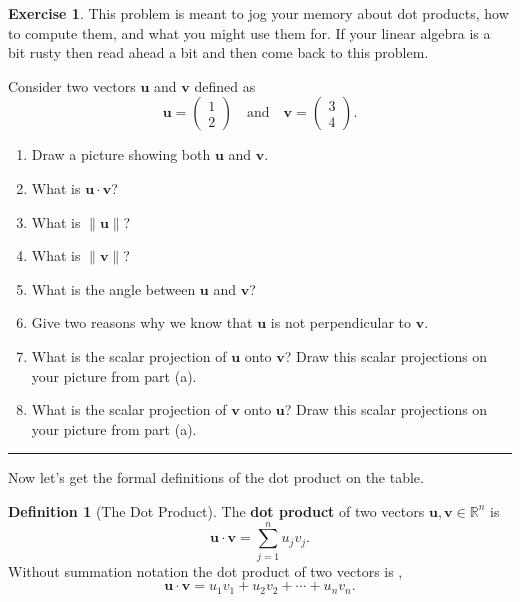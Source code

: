 \documentclass[
]{book}
\providecommand{\tightlist}{%
  \setlength{\itemsep}{0pt}\setlength{\parskip}{0pt}}
\theoremstyle{definition}
\newtheorem{definition}{Definition}[chapter]
\theoremstyle{definition}
\theoremstyle{definition}
\newtheorem{exercise}{Exercise}[chapter]
\theoremstyle{remark}
\begin{document}
\begin{exercise}
\protect\hypertarget{exr:unnamed-chunk-288}{}{\label{exr:unnamed-chunk-288} }This problem is meant to jog your memory about dot products, how to compute them, and what you might use them for. If your linear algebra is a bit rusty then read ahead a bit and then come back to this problem.

Consider two vectors \(\boldsymbol{u}\) and \(\boldsymbol{v}\) defined as
\[ \boldsymbol{u} = \begin{pmatrix} 1 \\ 2 \end{pmatrix} \quad \text{and} \quad \boldsymbol{v} = \begin{pmatrix} 3\\4 \end{pmatrix}. \]

\begin{enumerate}
\def\labelenumi{\alph{enumi}.}
\tightlist
\item
  Draw a picture showing both \(\boldsymbol{u}\) and \(\boldsymbol{v}\).
\item
  What is \(\boldsymbol{u} \cdot \boldsymbol{v}\)?
\item
  What is \(\|\boldsymbol{u}\|\)?
\item
  What is \(\|\boldsymbol{v}\|\)?
\item
  What is the angle between \(\boldsymbol{u}\) and \(\boldsymbol{v}\)?
\item
  Give two reasons why we know that \(\boldsymbol{u}\) is not perpendicular to \(\boldsymbol{v}\).
\item
  What is the scalar projection of \(\boldsymbol{u}\) onto \(\boldsymbol{v}\)? Draw this scalar projections on your picture from part (a).
\item
  What is the scalar projection of \(\boldsymbol{v}\) onto \(\boldsymbol{u}\)? Draw this scalar projections on your picture from part (a).
\end{enumerate}
\end{exercise}

\begin{center}\rule{0.5\linewidth}{0.5pt}\end{center}

Now let's get the formal definitions of the dot product on the table.

\begin{definition}[The Dot Product]
\protect\hypertarget{def:unnamed-chunk-289}{}{\label{def:unnamed-chunk-289} {} }The \textbf{dot product} of two vectors \(\boldsymbol{u}, \boldsymbol{v} \in \mathbb{R}^n\) is
\[\boldsymbol{u} \cdot \boldsymbol{v} = \sum_{j=1}^n u_j v_j.\]
Without summation notation the dot product of two vectors is ,
\[\boldsymbol{u} \cdot \boldsymbol{v} = u_1 v_1 + u_2 v_2 + \cdots + u_n v_n.\]
\end{definition}
\end{document}
